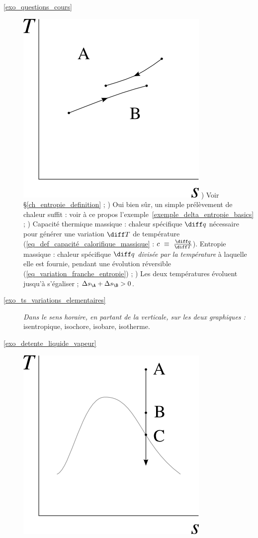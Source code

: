 \exercisesolutionpage
\titreresultats

	\begin{description}
		\item [\ref{exo_questions_cours}]
						\includegraphics[width=\solutiondiagramwidth]{images/exo_sol_ts_tasse.png}
						) Voir \S\ref{ch_entropie_definition} ;
						) Oui bien sûr, un simple prélèvement de chaleur suffit : voir à ce propos l’exemple~\ref{exemple_delta_entropie_basics} ;
						) Capacité thermique massique : chaleur spécifique $\diff q$ nécessaire pour générer une variation $\diff T$ de température (\cref{eq_def_capacité_calorifique_massique} : $c\ \equiv \ \frac{\diff q}{\diff T}$). Entropie massique : chaleur spécifique $\diff q$ \emph{divisée par la température} à laquelle elle est fournie, pendant une évolution réversible (\cref{eq_variation_franche_entropie}) ;
						) Les deux températures évoluent jusqu’à s’égaliser ; $\Delta s_\A + \Delta s_\B > 0$.
		\item [\ref{exo_ts_variations_elementaires}]
						\tab \textit{Dans le sens horaire, en partant de la verticale, sur les deux graphiques :} isentropique, isochore, isobare, isotherme.
		\item [\ref{exo_detente_liquide_vapeur}]
						\includegraphics[width=\solutiondiagramwidth]{images/exo_sol_ts_detente_eau.png}

\end{description}
